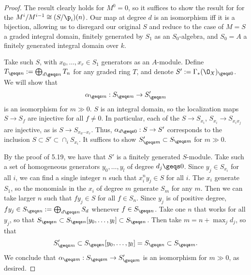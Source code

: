 \documentclass[12pt]{amsart}
\begin{document}
\begin{proof}
  The result clearly holds for $M^0=0$, so it suffices to show the result for for the $M^i/M^{i-1}\cong (S/\p_i)(n)$.
  Our map at degree $d$ is an isomorphism iff it is a bijection, allowing us to disregard our original $S$ and reduce to the case of $M=S$ a graded integral domain, finitely generated by $S_1$ as an $S_0$-algebra, and $S_0=A$ a finitely generated integral domain over $k$.

  Take such $S$, with $x_0,\ldots, x_r\in S_1$ generators as an $A$-module.
  Define $T_{\geqs n}:=\bigoplus_{d\geqs n}T_n$ for any graded ring $T$, and denote $S':=\Gamma_*(\O_X)_{\geqs 0}$.
  We will show that
  \[
    \alpha_{\geqs m}:S_{\geqs m}\to S'_{\geqs m}
  \]
  is an isomorphism for $m\gg0$.
  $S$ is an integral domain, so the localization maps $S\to S_f$ are injective for all $f\neq 0$.
  In particular, each of the $S\to S_{x_i}$, $S_{x_i}\to S_{x_ix_j}$ are injective, as is $S\to S_{x_0\cdots x_r}$.
  Thus, $\alpha_{d\geqs 0}:S\to S'$ corresponds to the inclusion $S\subset S'\subset \cap_iS_{x_i}$.
  It suffices to show $S'_{\geqs m}\subset S_{\geqs m}$ for $m\gg0$.

  By the proof of 5.19, we have that $S'$ is a finitely generated $S$-module.
  Take such a set of homogeneous generators $y_0,\ldots, y_l$ of degree $d_j\geqs 0$.
  Since $y_j\in S_{x_i}$ for all $i$, we can find a single integer $n$ such that $x_i^ny_j\in S$ for all $i$.
  The $x_i$ generate $S_1$, so the monomials in the $x_i$ of degree $m$ generate $S_m$ for any $m$.
  Then we can take larger $n$ such that $fy_j\in S$ for all $f\in S_n$.
  Since $y_j$ is of positive degree, $fy_j\in S_{\geqs n}:=\bigoplus_{d\geqs n}S_d$ whenever $f\in S_{\geqs n}$.
  Take one $n$ that works for all $y_j$, so that $S_{\geqs n}\subset S_{\geqs n}[y_0,\ldots, y_l]\subset S_{\geqs n}$.
  Then take $m=n+\max_j d_j$, so that
  \begin{align*}
    S'_{\geqs m} \subset S_{\geqs n}[y_0,\ldots,y_l]=S_{\geqs n}\subset S_{\geqs m}.
  \end{align*}
  We conclude that $\alpha_{\geqs m}:S_{\geqs m}\to S'_{\geqs m}$ is an isomorphism for $m\gg0$, as desired.


\end{proof}
\end{document}
